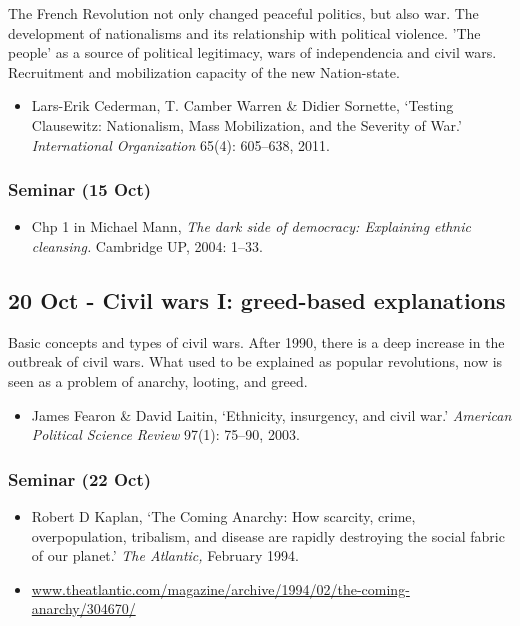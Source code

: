 \documentclass[12pt, a4paper]{article}
\begin{document}
The French Revolution not only changed peaceful politics, but also war. The development of nationalisms and its relationship with political violence. 'The people' as a source of political legitimacy, wars of independencia and civil wars. Recruitment and mobilization capacity of the new Nation-state.

\begin{itemize}
\setlength\itemsep{0pt}
\item Lars-Erik Cederman, T. Camber Warren \& Didier Sornette, `Testing Clausewitz: Nationalism, Mass Mobilization, and the Severity of War.' \textit{International Organization} 65(4): 605--638, 2011.
\end{itemize}

\subsubsection*{Seminar (15 Oct)}

\begin{itemize}
\setlength\itemsep{0pt}
\item Chp 1 in Michael Mann, \textit{The dark side of democracy: Explaining ethnic cleansing.} Cambridge UP, 2004: 1--33.
\end{itemize}

\subsection*{20 Oct - Civil wars I: greed-based explanations}

Basic concepts and types of civil wars. After 1990, there is a deep increase in the outbreak of civil wars. What used to be explained as popular revolutions, now is seen as a problem of anarchy, looting, and greed.

\begin{itemize}
\setlength\itemsep{0pt}
\item James Fearon \& David Laitin, `Ethnicity, insurgency, and civil war.' \textit{American Political Science Review} 97(1): 75--90, 2003.
\end{itemize}

\subsubsection*{Seminar (22 Oct)}

\begin{itemize}
\setlength\itemsep{-5pt}
\item Robert D Kaplan, `The Coming Anarchy: How scarcity, crime, overpopulation, tribalism, and disease are rapidly destroying the social fabric of our planet.' \textit{The Atlantic,} February 1994.
\item[] \href{https://www.theatlantic.com/magazine/archive/1994/02/the-coming-anarchy/304670/}{www.theatlantic.com/magazine/archive/1994/02/the-coming-anarchy/304670/}
\end{itemize}
\end{document}
